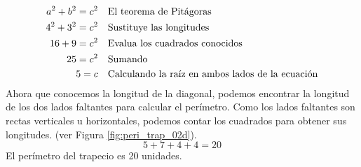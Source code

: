 \begin{solutionbox}{16cm}
\begin{minipage}{0.55\textwidth}
        \begin{align*}
            a^2+b^2  =c^2 & \text{\quad El teorema de Pitágoras}                          \\
            4^2+3^2  =c^2 & \text{\quad Sustituye las longitudes}                         \\
            16 +9 =c^2    & \text{\quad Evalua los cuadrados conocidos}                   \\
            25=c^2        & \text{\quad Sumando }                                         \\
            5=c           & \text{\quad Calculando la raíz en ambos lados de la ecuación} \\
        \end{align*}
        Ahora que conocemos la longitud de la diagonal, podemos encontrar la longitud de los dos lados faltantes para calcular el perímetro.
        Como los lados faltantes son rectas verticales u horizontales, podemos contar los cuadrados para obtener sus longitudes. (ver Figura \ref{fig:peri_trap_02d}).
        \[5+7+4+4=20\]
        El perímetro del trapecio es 20 unidades.
    \end{minipage}
\end{solutionbox}
